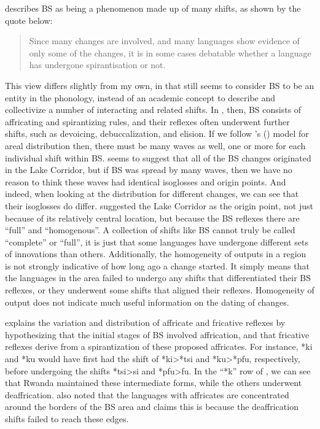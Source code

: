 \documentclass[output=paper,colorlinks,citecolor=brown
]{langscibook}
\begin{document}
\citet[84]{Janson2007} describes BS as being a phenomenon made up of many shifts, as shown by the quote below:
\begin{quote}
    Since many changes are involved, and many languages show evidence of only some of the changes, it is in some cases debatable whether a language has undergone spirantisation or not.
\end{quote}
This view differs slightly from my own, in that \citeauthor{Janson2007} still seems to consider BS to be an entity in the phonology, instead of an academic concept to describe and collectivize a number of interacting and related shifts. In \citet{Janson2007}, then, BS consists of affricating and spirantizing rules, and their reflexes often underwent further shifts, such as devoicing, debuccalization, and elision. If we follow \citeauthor{Janson2007}’s (\citeyear{Janson2007}) model for areal distribution then, there must be many waves as well, one or more for each individual shift within BS. \citeauthor{Janson2007} seems to suggest that all of the BS changes originated in the Lake Corridor, but if BS was spread by many waves, then we have no reason to think these waves had identical isoglosses and origin points. And indeed, when looking at the distribution for different changes, we can see that their isoglosses do differ. \citeauthor{Janson2007} suggested the Lake Corridor as the origin point, not just because of its relatively central location, but because the BS reflexes there are “full” and “homogenous”. A collection of shifts like BS cannot truly be called “complete” or “full”, it is just that some languages have undergone different sets of innovations than others. Additionally, the homogeneity of outputs in a region is not strongly indicative of how long ago a change started. It simply means that the languages in the area failed to undergo any shifts that differentiated their BS reflexes, or they underwent some shifts that aligned their reflexes. Homogeneity of output does not indicate much useful information on the dating of changes.

\citeauthor{Janson2007} explains the variation and distribution of affricate and fricative reflexes by hypothesizing that the initial stages of BS involved affrication, and that fricative reflexes derive from a spirantization of these proposed affricates. For instance, *ki and *ku would have first had the shift of *ki>*tsi and *ku>*pfu, respectively, before undergoing the shifts *tsi>si and *pfu>fu. In the “*k” row of , we can see that Rwanda maintained these intermediate forms, while the others underwent deaffrication. \citeauthor{Janson2007} also noted that the languages with affricates are concentrated around the borders of the BS area and claims this is because the deaffrication shifts failed to reach these edges.
\end{document}
